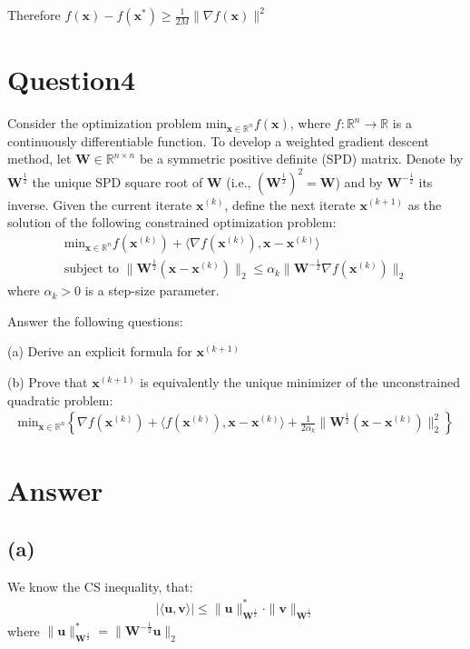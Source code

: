 \documentclass{article}
\newcommand{\R}{\mathbb{R}}
\begin{document}
Therefore \(f(\bm{x}) - f(\bm{x}^*) \geq \frac{1}{2M}\|\nabla f(\bm{x})\|^2\)

\section*{Question4}
Consider the optimization problem \(\text{min}_{\bm{x} \in \R^n} f(\bm{x})\), where \(f: \R^n \to \R\) is a continuously differentiable function. To develop a weighted gradient descent method, let \(\bm{W} \in \R^{n \times n}\) be a symmetric positive definite (SPD) matrix. Denote by \(\bm{W}^{\frac{1}{2}}\) the unique SPD square root of \(\bm{W}\) (i.e., \((\bm{W}^{\frac{1}{2}})^2 = \bm{W}\)) and by \(\bm{W}^{-\frac{1}{2}}\) its inverse. Given the current iterate \(\bm{x}^{(k)}\), define the next iterate \(\bm{x}^{(k + 1)}\) as the solution of the following constrained optimization problem:
\begin{align*}
    \text{min}_{\bm{x} \in \R^n}f(\bm{x}^{(k)}) + \langle \nabla f(\bm{x}^{(k)}), \bm{x} - \bm{x}^{(k)}\rangle \\
    \text{subject to } \|\bm{W}^{\frac{1}{2}} (\bm{x} - \bm{x}^(k))\|_2 \leq \alpha_k\|\bm{W}^{-\frac{1}{2}} \nabla f(\bm{x}^(k))\|_2
\end{align*}
where  \(\alpha_k > 0\) is a step-size parameter.

Answer the following questions:

(a) Derive an explicit formula for \(\bm{x}^{(k + 1)}\)

(b) Prove that \(\bm{x}^{(k + 1)}\) is equivalently the unique minimizer of the unconstrained quadratic problem:
\begin{align*}
    \text{min}_{\bm{x} \in \R^n} \left \{ \nabla f(\bm{x}^{(k)}) + \langle f(\bm{x}^{(k)}), \bm{x} - \bm{x}^{(k)} \rangle + \frac{1}{2\alpha_k} \|\bm{W}^{\frac{1}{2}} (\bm{x} - \bm{x}^{(k)})\|_2^2 \right \}
\end{align*}

\section*{Answer}
\subsection*{(a)}
We know the CS inequality, that:
\begin{align*}
    |\langle \bm{u}, \bm{v} \rangle| \leq \|\bm{u}\|_{\bm{W}^{\frac{1}{2}}}^* \cdot \|\bm{v}\|_{\bm{W}^{\frac{1}{2}}}
\end{align*}
where \(\|\bm{u}\|_{\bm{W}^{\frac{1}{2}}}^* = \|\bm{W}^{-\frac{1}{2}} \bm{u}\|_2\)
\end{document}
